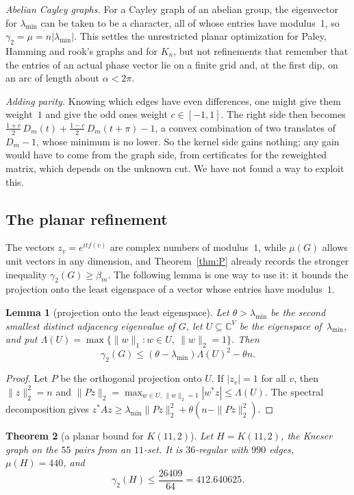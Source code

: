 \documentclass[11pt]{amsart}
\newcommand{\thmmarker}{}
\newcommand{\mgpt}{\gdef\thmmarker{\textsuperscript{$\dagger$}}}
\theoremstyle{tplain}
\newtheorem{theorem}{Theorem}[section]
\newtheorem{lemma}[theorem]{Lemma}
\theoremstyle{tdefinition}
\theoremstyle{tremark}
\newcommand{\lmin}{\lambda_{\min}}
\begin{document}
\emph{Abelian Cayley graphs.} For a Cayley graph of an abelian group, the
eigenvector for $\lmin$ can be taken to be a character, all of whose entries
have modulus~$1$, so $\gamma_2=\mu=n|\lmin|$. This settles the unrestricted
planar optimization for Paley, Hamming and rook's graphs and for $K_n$, but not refinements that
remember that the entries of an actual phase vector lie on a finite grid and, at the first dip, on
an arc of length about $\alpha<2\pi$.

\emph{Adding parity.} Knowing which edges have even differences, one might
give them weight~$1$ and give the odd ones weight $c\in[-1,1]$. The right side
then becomes $\frac{1+c}2\,D_m(t)+\frac{1-c}2\,D_m(t+\pi)-1$, a convex
combination of two translates of $D_m-1$, whose minimum is no lower. So the
kernel side gains nothing; any gain would have to come from the graph side,
from certificates for the reweighted matrix, which depends on the unknown
cut. We have not found a way to exploit this.

\subsection{The planar refinement}\label{sec:planar}

The vectors $z_v=e^{itf(v)}$ are complex
numbers of modulus~$1$, while $\mu(G)$ allows unit vectors in any dimension,
and Theorem~\ref{thm:P} already records the stronger inequality
$\gamma_2(G)\ge\beta_m$. The following lemma is one way to
use it: it bounds the projection onto the least eigenspace of a vector whose
entries have modulus~$1$.

\mgpt\begin{lemma}[projection onto the least eigenspace]\label{lem:projection}
Let $\theta>\lmin$ be the second smallest distinct adjacency eigenvalue of
$G$, let $U\subseteq\mathbb C^V$ be the eigenspace of~$\lmin$, and put
$\Lambda(U)=\max\{\|w\|_1:w\in U,\ \|w\|_2=1\}$. Then
\[
 \gamma_2(G)\le(\theta-\lmin)\Lambda(U)^2-\theta n.
\]
\end{lemma}

\begin{proof}
Let $P$ be the orthogonal projection onto $U$. If $|z_v|=1$ for all $v$, then
$\|z\|_2^2=n$ and $\|Pz\|_2=\max_{w\in U,\,\|w\|_2=1}|w^*z|\le\Lambda(U)$. The
spectral decomposition gives $z^*Az\ge\lmin\|Pz\|_2^2+\theta(n-\|Pz\|_2^2)$.
\end{proof}

\mgpt\begin{theorem}[a planar bound for $K(11,2)$]\label{thm:kg}
Let $H=K(11,2)$, the Kneser graph on the $55$ pairs from an $11$-set. It is
$36$-regular with $990$ edges, $\mu(H)=440$, and
\[
  \gamma_2(H)\le\frac{26409}{64}=412.640625.
\]
\end{theorem}
\end{document}
